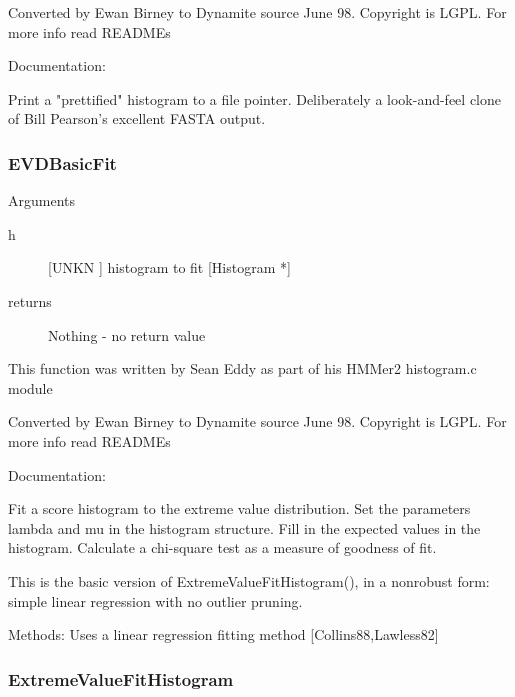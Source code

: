 Converted by Ewan Birney to Dynamite source June 98.
Copyright is LGPL. For more info read READMEs


Documentation:


Print a "prettified" histogram to a file pointer.
Deliberately a look-and-feel clone of Bill Pearson's 
excellent FASTA output.


\subsubsection{EVDBasicFit}

Arguments
\begin{description}
\item[h] [UNKN ] histogram to fit [Histogram *]
\item[returns] Nothing - no return value
\end{description}


This function was written by Sean Eddy
as part of his HMMer2 histogram.c module


Converted by Ewan Birney to Dynamite source June 98.
Copyright is LGPL. For more info read READMEs


Documentation:


Fit a score histogram to the extreme value 
distribution. Set the parameters lambda
and mu in the histogram structure. Fill in the
expected values in the histogram. Calculate
a chi-square test as a measure of goodness of fit. 


This is the basic version of ExtremeValueFitHistogram(),
in a nonrobust form: simple linear regression with no
outlier pruning.


Methods:  Uses a linear regression fitting method [Collins88,Lawless82]


\subsubsection{ExtremeValueFitHistogram}

